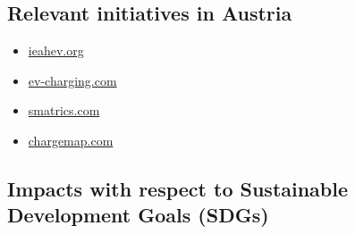 \documentclass[
]{book}
\providecommand{\tightlist}{%
  \setlength{\itemsep}{0pt}\setlength{\parskip}{0pt}}
\begin{document}
\hypertarget{relevant-initiatives-in-austria-7}{%
\subsection*{Relevant initiatives in Austria}\label{relevant-initiatives-in-austria-7}}

\begin{itemize}
\tightlist
\item
  \href{http://www.ieahev.org/by-country/austria-charging-infrastructure/}{ieahev.org}
\item
  \href{https://ev-charging.com/at/en/elektrotankstellen}{ev-charging.com}
\item
  \href{https://smatrics.com/en/charging-network}{smatrics.com}
\item
  \href{https://chargemap.com/cities/wien-AT}{chargemap.com}
\end{itemize}

\hypertarget{impacts-with-respect-to-sustainable-development-goals-sdgs-7}{%
\subsection*{Impacts with respect to Sustainable Development Goals (SDGs)}\label{impacts-with-respect-to-sustainable-development-goals-sdgs-7}}
\end{document}
